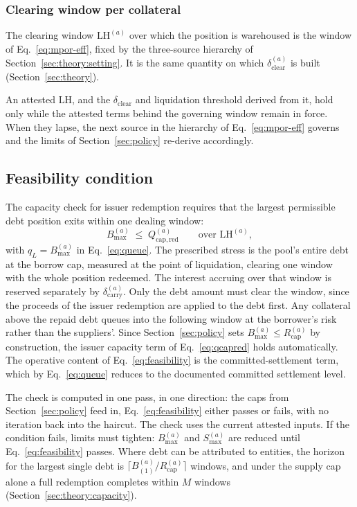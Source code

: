 \subsubsection{Clearing window per collateral}
The clearing window $\mathrm{LH}^{(a)}$ over which the position is warehoused is the
window of Eq.~\eqref{eq:mpor-eff}, fixed by the three-source hierarchy of
Section~\ref{sec:theory:setting}. It is the same
quantity on which $\delta_{\mathrm{clear}}^{(a)}$ is built (Section~\ref{sec:theory}).

An attested $\mathrm{LH}$, and the $\delta_{\mathrm{clear}}$ and liquidation threshold
derived from it, hold only while the attested terms behind the governing window remain in
force. When they
lapse, the next source in the hierarchy of Eq.~\eqref{eq:mpor-eff} governs and the limits
of Section~\ref{sec:policy} re-derive accordingly.

\subsection{Feasibility condition}\label{sec:feasibility}
The capacity check for issuer redemption requires that the largest permissible
debt position exits within one dealing window:
\begin{equation}\label{eq:feasibility}
B_{\max}^{(a)} \;\le\; Q_{\mathrm{cap,red}}^{(a)}
\qquad \text{over } \mathrm{LH}^{(a)},
\end{equation}
with $q_L = B_{\max}^{(a)}$ in Eq.~\eqref{eq:queue}. The prescribed stress is the
pool's entire debt at the borrow cap, measured at the point of liquidation, clearing one
window with the whole position redeemed. The interest accruing over that window is reserved
separately by $\delta_{\mathrm{carry}}^{(a)}$. Only the debt amount must clear the window, since the proceeds of the issuer
redemption are applied to the debt first. Any collateral above the repaid debt
queues into the following window at the borrower's risk rather than the
suppliers'. Since Section~\ref{sec:policy} sets
$B_{\max}^{(a)} \le R_{\mathrm{cap}}^{(a)}$ by construction, the issuer capacity term of
Eq.~\eqref{eq:qcapred} holds automatically. The operative content of
Eq.~\eqref{eq:feasibility} is the committed-settlement term, which by Eq.~\eqref{eq:queue} reduces to
the documented committed settlement level.

The check is computed in one pass, in one direction: the caps from Section~\ref{sec:policy} feed
in, Eq.~\eqref{eq:feasibility} either passes or fails, with no iteration
back into the haircut. The check uses the current attested inputs. If the condition fails, limits must tighten:
$B_{\max}^{(a)}$ and $S_{\max}^{(a)}$ are
reduced until Eq.~\eqref{eq:feasibility} passes. Where debt can be attributed to entities, the horizon for the largest single debt is $\lceil B_{(1)}^{(a)}/R_{\mathrm{cap}}^{(a)}\rceil$ windows, and under the supply cap alone a full redemption completes within $M$ windows (Section~\ref{sec:theory:capacity}).

